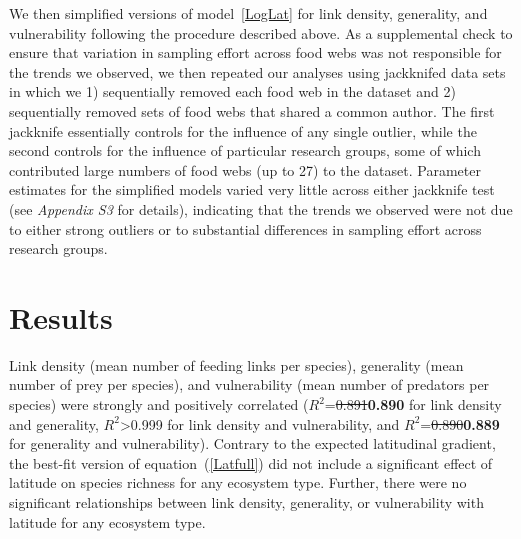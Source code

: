 \documentclass[12pt]{article}
\begin{document}
    We then simplified versions of model~\ref{LogLat} for link density, generality, and vulnerability following the procedure described above.
    As a supplemental check to ensure that variation in sampling effort
    across food webs was not responsible for the trends we observed, we then
    repeated our analyses using jackknifed data sets in which we 1) sequentially
    removed each food web in the dataset and 2) sequentially removed sets of food webs
    that shared a common author. The first jackknife essentially controls for the
    influence of any single outlier, while the second controls for the influence
    of particular research groups, some of which contributed large numbers of food
    webs (up to 27) to the dataset. Parameter estimates for the simplified models 
    varied very little across either jackknife test (see \emph{Appendix S3} for details),
    indicating that the trends we observed were not due to either strong outliers or
    to substantial differences in sampling effort across research groups.


\section*{Results}

  Link density (mean number of feeding links per species), generality (mean
  number of prey per species), and vulnerability (mean number of predators per
  species) were strongly and positively correlated ($R^2$=\st{0.891}\textbf{0.890} for link
  density and generality, $R^2$\textgreater0.999 for link density and
  vulnerability, and $R^2$=\st{0.890}\textbf{0.889} for generality and vulnerability). Contrary
  to the expected latitudinal gradient, the best-fit version of
  equation~(\ref{Latfull}) did not include a significant
  effect of latitude on species richness for any ecosystem type. Further, there were no significant
  relationships between link density, generality, or vulnerability with
  latitude for any ecosystem type.


\end{document}
